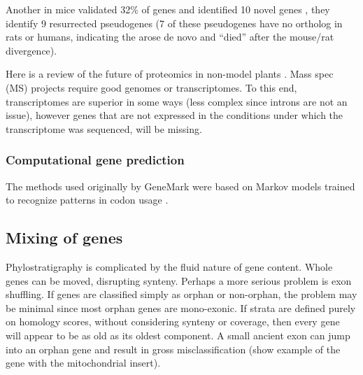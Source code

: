 
  Another in mice validated 32\% of genes and identified 10 novel genes
  \cite{brosch_shotgun_2011}, they identify 9 resurrected pseudogenes (7 of
  these pseudogenes have no ortholog in rats or humans, indicating the arose de
  novo and ``died'' after the mouse/rat divergence).

  Here is a review of the future of proteomics in non-model plants
  \cite{champagne_proteomics_2013}. Mass spec (MS) projects require good
  genomes or transcriptomes. To this end, transcriptomes are superior in some
  ways (less complex since introns are not an issue), however genes that are
  not expressed in the conditions under which the transcriptome was sequenced,
  will be missing.

\subsubsection{Computational gene prediction}

The methods used originally by GeneMark were based on Markov models trained to
recognize patterns in codon usage \cite{besemer_heuristic_1999}.


\subsection{Mixing of genes}

Phylostratigraphy is complicated by the fluid nature of gene content. Whole
genes can be moved, disrupting synteny.  Perhaps a more serious problem is exon
shuffling. If genes are classified simply as orphan or non-orphan, the problem
may be minimal since most orphan genes are mono-exonic. If strata are defined
purely on homology scores, without considering synteny or coverage, then every
gene will appear to be as old as its oldest component. A small ancient exon can
jump into an orphan gene and result in gross misclassification (show example of
the gene with the mitochondrial insert).

